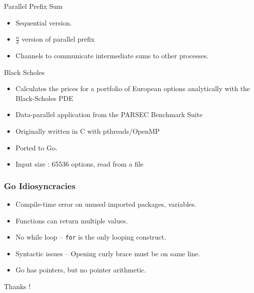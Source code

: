 \documentclass{beamer}
\begin{document}
\begin{frame} {Parallel Prefix Sum}
\begin{itemize}
  \item Sequential version.
  \item $\frac{n}{k}$ version of parallel prefix
  \item Channels to communicate intermediate sums to other processes.
\end{itemize}

\end{frame}

\begin{frame} {Black Scholes}
  \begin{itemize}
   \item Calculates the prices for a portfolio of European options analytically with the Black-Scholes PDE
   \item Data-parallel application from the PARSEC Benchmark Suite
   \item Originally written in C with pthreads/OpenMP
   \item Ported to Go.
   \item Input size : 65536 options, read from a file
  \end{itemize}
\end{frame}

\begin{frame}[fragile]
  \frametitle{Go Idiosyncracies}
  \begin{itemize}
   \item Compile-time error on unused imported packages, variables.
   \item Functions can return multiple values.
   \item No while loop -- \verb=for= is the only looping construct.
   \item Syntactic issues -- Opening curly brace must be on same line.
   \item Go has pointers, but no pointer arithmetic. 
  \end{itemize}
\end{frame}

\begin{frame}
\begin{center}
 Thanks !
\end{center}
\end{frame}
\end{document}
